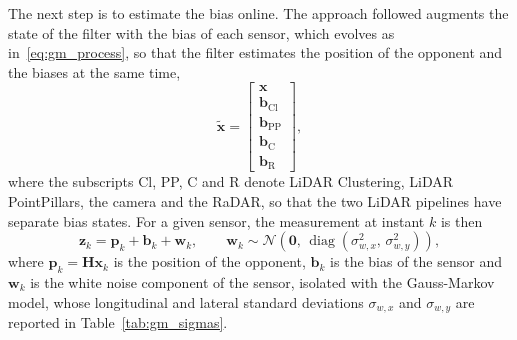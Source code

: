 The next step is to estimate the bias online. The approach followed
augments the state of the filter with the bias of each sensor, which evolves as in~\eqref{eq:gm_process}, so that the filter estimates the
position of the opponent and the biases at the same time,
\begin{equation}
    \tilde{\mathbf{x}} =
    \begin{bmatrix} \mathbf{x} \\ \mathbf{b}_{\mathrm{Cl}} \\ \mathbf{b}_{\mathrm{PP}} \\
    \mathbf{b}_{\mathrm{C}} \\ \mathbf{b}_{\mathrm{R}} \end{bmatrix},
\end{equation}
where the subscripts Cl, PP, C and R denote LiDAR Clustering, LiDAR PointPillars, the camera
and the RaDAR, so that the two LiDAR pipelines have separate bias states. For a given
sensor, the measurement at instant $k$ is then
\begin{equation}
    \mathbf{z}_k = \mathbf{p}_k + \mathbf{b}_k + \mathbf{w}_k,
    \qquad
    \mathbf{w}_k \sim \mathcal{N}\!\left(\mathbf{0},\,
    \operatorname{diag}\!\left(\sigma_{w,x}^2,\, \sigma_{w,y}^2\right)\right),
    \label{eq:gm_augmented}
\end{equation}
where $\mathbf{p}_k = \mathbf{H}\mathbf{x}_k$ is the position of the opponent,
$\mathbf{b}_k$ is the bias of the sensor and $\mathbf{w}_k$ is the white noise component of
the sensor, isolated with the Gauss-Markov model, whose longitudinal and lateral standard
deviations $\sigma_{w,x}$ and $\sigma_{w,y}$ are reported in Table~\ref{tab:gm_sigmas}.

